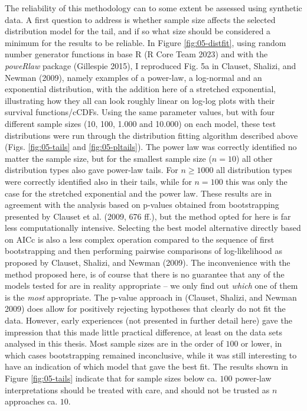 \documentclass[
  12pt,
  a4paper, twoside]{book}
\begin{document}
The reliability of this methodology can to some extent be assessed using synthetic data. A first question to address is whether sample size affects the selected distribution model for the tail, and if so what size should be considered a minimum for the results to be reliable. In Figure \ref{fig:05-distfit}, using random number generator functions in base R (R Core Team 2023) and with the \emph{poweRlaw} package (Gillespie 2015), I reproduced Fig. 5a in Clauset, Shalizi, and Newman (2009), namely examples of a power-law, a log-normal and an exponential distribution, with the addition here of a stretched exponential, illustrating how they all can look roughly linear on log-log plots with their survival functions/cCDFs. Using the same parameter values, but with four different sample sizes (10, 100, 1.000 and 10.000) on each model, these test distributions were run through the distribution fitting algorithm described above (Figs. \ref{fig:05-tails} and \ref{fig:05-pltails}). The power law was correctly identified no matter the sample size, but for the smallest sample size (\(n = 10\)) all other distribution types also gave power-law tails. For \(n \geq 1000\) all distribution types were correctly identified also in their tails, while for \(n = 100\) this was only the case for the stretched exponential and the power law. These results are in agreement with the analysis based on p-values obtained from bootstrapping presented by Clauset et al. (2009, 676 ff.), but the method opted for here is far less computationally intensive. Selecting the best model alternative directly based on AICc is also a less complex operation compared to the sequence of first bootstrapping and then performing pairwise comparisons of log-likelihood as proposed by Clauset, Shalizi, and Newman (2009). The inconvenience with the method proposed here, is of course that there is no guarantee that any of the models tested for are in reality appropriate -- we only find out \emph{which} one of them is the \emph{most} appropriate. The p-value approach in (Clauset, Shalizi, and Newman 2009) does allow for positively rejecting hypotheses that clearly do not fit the data. However, early experiences (not presented in further detail here) gave the impression that this made little practical difference, at least on the data sets analysed in this thesis. Most sample sizes are in the order of \(100\) or lower, in which cases bootstrapping remained inconclusive, while it was still interesting to have an indication of which model that gave the best fit. The results shown in Figure \ref{fig:05-tails} indicate that for sample sizes below ca. \(100\) power-law interpretations should be treated with care, and should not be trusted as \(n\) approaches ca. \(10\).
\end{document}
